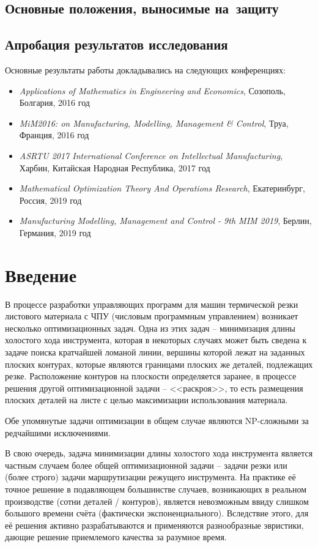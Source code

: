 \documentclass[14pt]{extarticle}
\theoremstyle{plain}%
\theoremstyle{remark}
\begin{document}
\subsection*{Основные положения, выносимые на~защиту}

\subsection*{Апробация результатов исследования}

Основные результаты работы докладывались на
следующих конференциях:

\begin{itemize}
  \item
  \textit{Applications of Mathematics in Engineering and Economics},
  Созополь, Болгария, 2016 год
  \item
  \textit{MiM2016: on Manufacturing, Modelling, Management \& Control},
  Труа, Франция, 2016 год
  \item
  \textit{ASRTU 2017 International Conference on Intellectual Manufacturing},
  Харбин, Китайская Народная Республика, 2017 год
  \item
  \textit{Mathematical Optimization Theory And Operations Research},
  Екатеринбург, Россия, 2019 год
  \item
  \textit{Manufacturing Modelling, Management and Control - 9th MIM 2019},
  Берлин, Германия, 2019 год
\end{itemize}

\section{Введение}

В процессе разработки управляющих программ
для машин термической резки
листового материала с ЧПУ
(числовым программным управлением)
возникает несколько оптимизационных задач.
Одна из этих задач --
минимизация длины холостого хода инструмента,
которая в некоторых случаях может
быть сведена к задаче поиска кратчайшей
ломаной линии,
вершины которой лежат на заданных плоских контурах,
которые являются границами плоских же деталей,
подлежащих резке.
Расположение контуров на плоскости
определяется заранее,
в процессе решения другой оптимизационной задачи --
<<раскроя>>,
то есть размещения плоских деталей на листе
с целью максимизации использования материала.

Обе упомянутые задачи оптимизации
в общем случае являются
NP-сложными
за редчайшими исключениями.

В свою очередь,
задача минимизации длины холостого хода инструмента
является частным случаем более общей оптимизационной задачи --
задачи резки или
(более строго)
задачи маршрутизации режущего инструмента.
На практике её точное решение
в подавляющем большинстве случаев,
возникающих в реальном производстве
(сотни деталей / контуров),
является невозможным ввиду
слишком большого времени счёта
(фактически экспоненциального).
Вследствие этого,
для её решения
активно разрабатываются и применяются
разнообразные эвристики,
дающие решение приемлемого
качества за разумное время.
\end{document}
